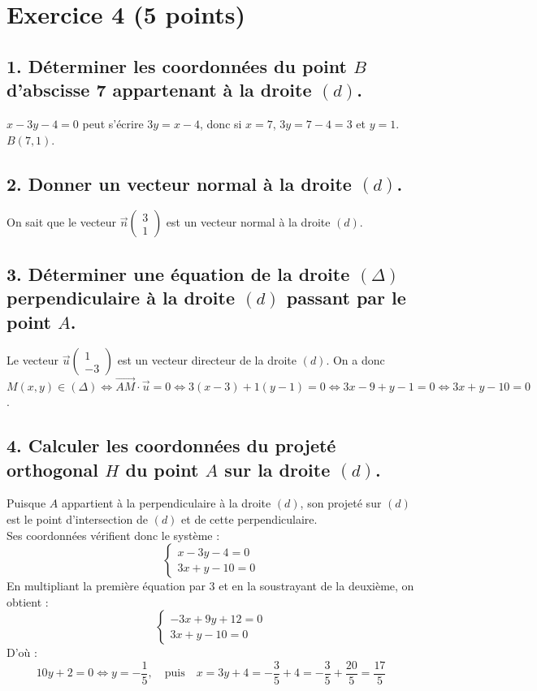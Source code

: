\section*{Exercice 4 (5 points)}
	
	\subsection*{1. Déterminer les coordonnées du point $B$ d’abscisse 7 appartenant à la droite $(d)$.}
	
$x - 3y - 4 = 0$ peut s’écrire $3y = x - 4$, donc si $x = 7$, $3y = 7 - 4 = 3$ et $y = 1$. $B(7, 1)$.
	
	\subsection*{2. Donner un vecteur normal à la droite $(d)$.}
	
On sait que le vecteur $\overrightarrow{n} \left( \begin{array}{c} 3 \\ 1 \end{array} \right)$ est un vecteur normal à la droite $(d)$.
	
	\subsection*{3. Déterminer une équation de la droite $(\Delta)$ perpendiculaire à la droite $(d)$ passant par le point $A$.}
	
Le vecteur $\overrightarrow{u} \left( \begin{array}{c} 1 \\ -3 \end{array} \right)$ est un vecteur directeur de la droite $(d)$. On a donc $M(x, y) \in (\Delta) \Leftrightarrow \overrightarrow{AM} \cdot \overrightarrow{u} = 0 \Leftrightarrow 3(x - 3) + 1(y - 1) = 0 \Leftrightarrow 3x - 9 + y - 1 = 0 \Leftrightarrow 3x + y - 10 = 0$.
	
	\subsection*{4. Calculer les coordonnées du projeté orthogonal $H$ du point $A$ sur la droite $(d)$.}
	
Puisque $A$ appartient à la perpendiculaire à la droite $(d)$, son projeté sur $(d)$ est le point d’intersection de $(d)$ et de cette perpendiculaire.\\
Ses coordonnées vérifient donc le système :
	\[
	\begin{cases}
		x - 3y - 4 = 0 \\
		3x + y - 10 = 0
	\end{cases}
	\]
En multipliant la première équation par 3 et en la soustrayant de la deuxième, on obtient :
	\[
	\begin{cases}
		-3x + 9y + 12 = 0 \\
		3x + y - 10 = 0
	\end{cases}
	\]
D'où :
	\[
	10y + 2 = 0 \Leftrightarrow y = -\dfrac{1}{5}, \quad \text{puis} \quad x = 3y + 4 = -\dfrac{3}{5} + 4 = -\dfrac{3}{5} + \dfrac{20}{5} = \dfrac{17}{5}
	\]
	
